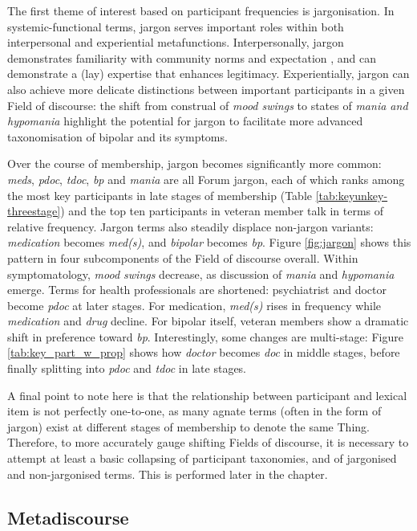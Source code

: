 The first theme of interest based on participant frequencies is jargonisation. In systemic\hyp{}functional terms, jargon serves important roles within both interpersonal and experiential metafunctions. Interpersonally, jargon demonstrates familiarity with community norms and expectation \cite{martin_language_2005}, and can demonstrate a (lay) expertise that enhances legitimacy. Experientially, jargon can also achieve more delicate distinctions between important participants in a given Field of discourse: the shift from construal of \emph{mood swings} to states of \emph{mania and hypomania} highlight the potential for jargon to facilitate more advanced taxonomisation of \gls{bipolar} and its symptoms.

Over the course of membership, jargon becomes significantly more common: \emph{meds}, \emph{pdoc}, \emph{tdoc}, \emph{bp} and \emph{mania} are all \gls{Forum} jargon, each of which ranks among the most key participants in late stages of membership (Table \ref{tab:keyunkey-threestage}) and the top ten participants in veteran \gls{member} talk in terms of relative frequency. Jargon terms also steadily displace non\hyp{}jargon variants: \emph{medication} becomes \emph{med(s)}, and \emph{bipolar} becomes \emph{bp}. Figure \ref{fig:jargon} shows this pattern in four subcomponents of the Field of discourse overall. Within symptomatology, \emph{mood swings} decrease, as discussion of \emph{mania} and \emph{hypomania} emerge. Terms for health professionals are shortened: psychiatrist and doctor become \emph{pdoc} at later stages. For medication, \emph{med(s)} rises in frequency while \emph{medication} and \emph{drug} decline. For \gls{bipolar} itself, veteran members show a dramatic shift in preference toward \emph{bp}. Interestingly, some changes are multi\hyp{}stage: Figure \ref{tab:key_part_w_prop} shows how \emph{doctor} becomes \emph{doc} in middle stages, before finally splitting into \emph{pdoc} and \emph{tdoc} in late stages.

A final point to note here is that the relationship between participant and lexical item is not perfectly one\hyp{}to\hyp{}one, as many agnate terms (often in the form of jargon) exist at different stages of membership to denote the same Thing. Therefore, to more accurately gauge shifting Fields of discourse, it is necessary to attempt at least a basic collapsing of participant taxonomies, and of jargonised and non\hyp{}jargonised terms. This is performed later in the chapter.

\subsection{Metadiscourse}

